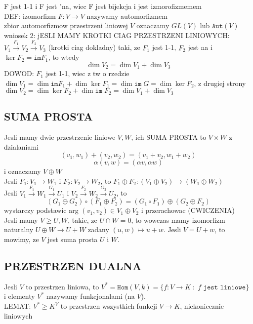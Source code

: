 \documentclass{article}
\begin{document}
    F jest 1-1 i F jest "na, wiec F jest bijekcja i jest izmorofizmemem\\
    DEF: izomorfizm $F:V\to V$ nazywamy automorfizmem\\
    zbior automorfizmow przestrzeni liniowej $V$ oznaczamy $GL(V)$ lub $\texttt{Aut}(V)$\\
    wniosek 2: jESLI MAMY KROTKI CIAG PRZESTRZENI LINIOWYCH: $V_1\overset{F_1}{\to}V_2\overset{F_2}{\to}V_3$ (krotki ciag dokladny) taki, ze $F_1$ jest 1-1, $F_2$ jest na i $\ker F_2=\texttt{im}F_1$, to wtedy$$\dim V_2=\dim V_1+\dim V_3$$
    DOWOD: $F_1$ jest 1-1, wiec z tw o rzedzie $\dim V_1=\dim\texttt{im}F_1+\dim \ker F_1 = \dim\texttt{im}\;G=\dim\ker F_2$, z drugiej strony $\dim V_2=\dim \ker F_2+\dim \texttt{im}\;F_2=\dim V_1+\dim V_3$
\subsection*{SUMA PROSTA}
    Jesli mamy dwie przestrzenie liniowe $V, W$, ich SUMA PROSTA to $V\times W$ z dzialaniami
    $$(v_1, w_1)+(v_2, w_2)=(v_1+v_2, w_1+w_2)$$
    $$\alpha(v,w)=(\alpha v, \alpha w)$$
    i oznaczamy $V\oplus W$\\
    Jesli $F_1:V_1\to W_1$ i $F_2: V_2\to W_2$, to $F_1\oplus F_2:(V_1\oplus V_2)\to (W_1\oplus W_2)$\\
    Jesli $V_1\overset{F_1}{\to} W_1\overset{G_1}{\to} U_1$ i $V_2\overset{F_2}{\to} W_2\overset{G_2}{\to} U_2$, to
    $$(G_1\oplus G_2)\circ(F_1\oplus F_2)=(G_1\circ F_1)\oplus(G_2\oplus F_2)$$
    wystarczy podstawic arg $(v_1, v_2)\in V_1\oplus V_2$ i przerachowac (\color{tit}CWICZENIA\color{txt})\\
    Jesli mamy $V\geq U,W$, takie, ze $U\cap W=0$, to wowczas mamy izomorfizm naturalny $U\oplus W\to U+W$ zadany $(u,w)\mapsto u+w$. Jesli $V=U+w$, to mowimy, ze $V$ jest suma prosta $U$ i $W$.
\subsection*{PRZESTRZEN DUALNA}
    Jesli $V$ to przestrzen liniowa, to $V^*=\texttt{Hom}(V, k)=\{f:V\to K\;:\;f\texttt{ jest liniowe}\}$ i elementy $V^*$ nazywamy funkcjonalami (na $V$).\\
    LEMAT: $V^*\geq K^V$ to przestrzen wszystkich funkcji $V\to K$, niekoniecznie liniowych
\end{document}

